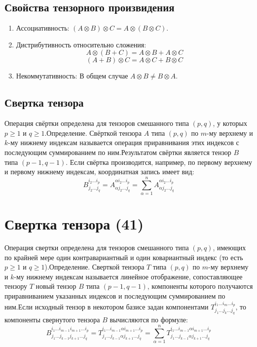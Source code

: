 \documentclass[14pt]{extreport}
\begin{document}
    \section{Свойства тензорного произвидения}
    \begin{enumerate}
        \item Ассоциативность: $(A \otimes B) \otimes C = A \otimes (B \otimes C)$.
        \item Дистрибутивность относительно сложения:$$A \otimes (B + C) = A \otimes B + A \otimes C$$$$(A + B) \otimes C = A \otimes C + B \otimes C$$
        \item Некоммутативность: В общем случае $A \otimes B \neq B \otimes A$.
    \end{enumerate}

    \section{Свертка тензора}
    Операция свёртки определена для тензоров смешанного типа $(p, q)$, у которых $p \ge 1$ и $q \ge 1$.Определение. Свёрткой тензора $A$ типа $(p, q)$ по $m$-му верхнему и $k$-му нижнему индексам называется операция приравнивания этих индексов с последующим суммированием по ним.Результатом свёртки является тензор $B$ типа $(p-1, q-1)$. Если свёртка производится, например, по первому верхнему и первому нижнему индексам, координатная запись имеет вид:$$B^{i_2 \dots i_p}_{j_2 \dots j_q} = A^{\alpha i_2 \dots i_p}_{\alpha j_2 \dots j_q} = \sum_{\alpha=1}^n A^{\alpha i_2 \dots i_p}_{\alpha j_2 \dots j_q}$$

    \chapter{Свертка тензора (41)}

    Операция свертки определена для тензоров смешанного типа $(p, q)$, имеющих по крайней мере один контравариантный и один ковариантный индекс (то есть $p \ge 1$ и $q \ge 1$).Определение. Сверткой тензора $T$ типа $(p, q)$ по $m$-му верхнему и $k$-му нижнему индексам называется линейное отображение, сопоставляющее тензору $T$ новый тензор $B$ типа $(p-1, q-1)$, компоненты которого получаются приравниванием указанных индексов и последующим суммированием по ним.Если исходный тензор в некотором базисе задан компонентами $T^{i_1 \dots i_m \dots i_p}_{j_1 \dots j_k \dots j_q}$, то компоненты свернутого тензора $B$ вычисляются по формуле:$$B^{i_1 \dots i_{m-1} i_{m+1} \dots i_p}_{j_1 \dots j_{k-1} j_{k+1} \dots j_q} = T^{i_1 \dots i_{m-1} \alpha i_{m+1} \dots i_p}_{j_1 \dots j_{k-1} \alpha j_{k+1} \dots j_q} = \sum_{\alpha=1}^n T^{i_1 \dots i_{m-1} \alpha i_{m+1} \dots i_p}_{j_1 \dots j_{k-1} \alpha j_{k+1} \dots j_q}$$
\end{document}
